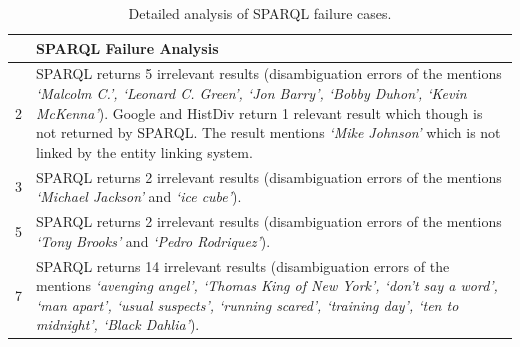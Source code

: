 \documentclass[twocolumn]{svjour3}
\begin{document}
\begin{table}[]
\centering
\caption{Detailed analysis of SPARQL failure cases.}
\vspace{-1mm}
\setlength{\tabcolsep}{4pt}
\label{tbl:failure}
\begin{tabular}{|c|p{155mm}|}
\hline
\rowcolor[HTML]{EFEFEF}
\multicolumn{1}{|l|}{\cellcolor[HTML]{EFEFEF}\textbf{Query}} & \textbf{SPARQL Failure Analysis}                                                                                                                                                                                                                                                                                                                                                    \\ \hline
2                                                            & SPARQL returns 5 irrelevant results (disambiguation errors of the mentions {\em \lq{}Malcolm C.', \lq{}Leonard C. Green', \lq{}Jon Barry', \lq{}Bobby Duhon', \lq{}Kevin McKenna'}). Google and HistDiv return 1 relevant result which though is not returned by SPARQL. The result mentions {\em \lq{}Mike Johnson'} which is not linked by the entity linking system. \\ \hline
3                                                            & SPARQL returns 2 irrelevant results (disambiguation errors of the mentions {\em \lq{}Michael Jackson'} and {\em \lq{}ice cube'}).                                                                                                                                                                                                                                                                       \\ \hline
5                                                            & SPARQL returns 2 irrelevant results (disambiguation errors of the mentions {\em \lq{}Tony Brooks'} and {\em \lq{}Pedro Rodriquez'}).                                                                                                                                                                                                                                                                    \\ \hline
7                                                            & SPARQL returns 14 irrelevant results (disambiguation errors of the mentions {\em \lq{}avenging angel', \lq{}Thomas King of New York', \lq{}don't say a word', \lq{}man apart', \lq{}usual suspects', \lq{}running scared', \lq{}training day', \lq{}ten to midnight', \lq{}Black Dahlia'}).                                                                                                                                   \\ \hline

\end{tabular}
\end{table}
\end{document}
